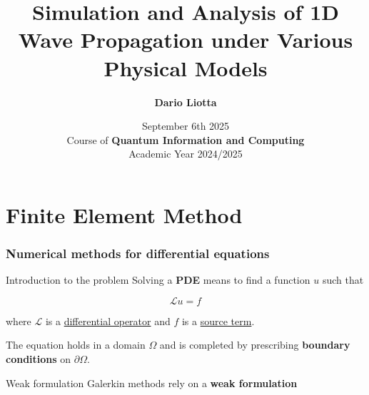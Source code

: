 \documentclass[10pt,externalviewer]{beamer}
\title{Simulation and Analysis of 1D Wave Propagation under Various Physical Models}
\author[Dario Liotta]{\large{\textbf{Dario Liotta}}}
\institute[Physics of Data (UniPD)]{
\begin{minipage}[c]{3.4truecm}
\texttt{[image: logo-unipd]}
\end{minipage}
\begin{minipage}[c]{2truecm}
   \begin{flushleft}
   \end{flushleft}
\end{minipage}
\begin{minipage}[c]{4.2truecm}
\texttt{[image: logo-dfa]}
\end{minipage}}
\date{September 6th 2025 \\ Course of \textbf{Quantum Information and Computing} \\ Academic Year 2024/2025}
\begin{document}
\begin{frame}[plain]
\titlepage
\end{frame}

\section{Finite Element Method}

\begin{frame}
   \frametitle{Numerical methods for differential equations}

   
\end{frame}

\begin{frame}{Introduction to the problem}
   Solving a \textbf{\textcolor{BrickRed}{PDE}} means to find a function $u$ such that

   \begin{equation*}
      \mathcal{L}u=f
   \end{equation*}

   where $\mathcal{L}$ is a \underline{differential operator} and $f$ is a \underline{source term}.

   \vspace{0.3cm}

   The equation holds in a domain $\Omega$ and is completed by prescribing \textbf{boundary conditions} on $\partial\Omega$.

   \vfill

   \begin{figure}[H]
      \centering
   \end{figure}
\end{frame}

\begin{frame}{Weak formulation}
   Galerkin methods rely on a \textbf{\textcolor{BrickRed}{weak formulation}}
\end{frame}
\end{document}
